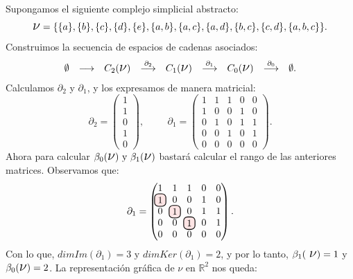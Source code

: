 \documentclass[12pt, a4paper, twoside]{book}
\newcommand\hlightr[1]{\tikz[overlay, remember picture,baseline=-
\the\dimexpr\fontdimen22\textfont2\relax]\node[rectangle,fill=red!50,rounded 
corners,fill opacity = 0.2,draw,thick,text opacity =1] {$#1$};}
\numberwithin{equation}{section}
\theoremstyle{definition}
\newenvironment{ejem}
  {\pushQED{\qed}\renewcommand{\qedsymbol}{$\blacktriangleleft$}\ejemplo}
  {\popQED\endejemplo}
\theoremstyle{remark}
\theoremstyle{plain}
\begin{document}
	\begin{ejem}
		Supongamos el siguiente complejo simplicial abstracto:
		\begin{equation*} 
			\text{{\Large $\nu$}}=\{\{a\},\{b\},\{c\},\{d\},\{e\},
			\{a,b\},\{a,c\},\{a,d\},\{b,c\},\{c,d\},\{a,b,c\}\}.
		\end{equation*}
		Construimos la secuencia de espacios de cadenas asociados:
		\begin{equation*}
			 \left.
			\begin{array}{ccccccccc}
				\emptyset & 
				\longrightarrow & C_{2}(
				\text{{\Large $\nu$}}) & 
				\overset{\partial_{2}}{
				\longrightarrow} & C_{1}(\text{{\Large $\nu$}}) 
						& \overset{\partial_{1}}{
				\longrightarrow} 
				& C_{0}(\text{{\Large $\nu$}}) & 
				\overset{\partial_{0}}{
				\longrightarrow} & \emptyset. 
			\end{array}
			\right. 
		\end{equation*}
		Calculamos $\partial_{2}$ y $\partial_{1}$, y los expresamos 
		de manera matricial:
		\begin{equation*}
			\partial_{2}=
			\begin{pmatrix}
			1 \\
			1 \\
			0 \\
			1 \\
			0
			\end{pmatrix},
			\hspace{1cm}
			\partial_{1}=
			\begin{pmatrix}
			1 & 1 & 1 & 0 & 0\\
			1 & 0 & 0 & 1 & 0\\
			0 & 1 & 0 & 1 & 1\\
			0 & 0 & 1 & 0 & 1\\
			0 & 0 & 0 & 0 & 0
			\end{pmatrix}.
		\end{equation*}
		Ahora para calcular $\beta_{0}(\text{{\Large $\nu$}}) 
		\text{ y } \beta_{1}(\text{{\Large $\nu$}})$ bastará
		calcular el rango de las anteriores matrices. Observamos que:
		\begin{equation*}
			\partial_{1}=
			\begin{pmatrix}
			1 & 1 & 1 & 0 & 0\\
			\hlightr{1} & 0 & 0 & 1 & 0\\
			0 & \hlightr{1} & 0 & 1 & 1\\
			0 & 0 & \hlightr{1} & 0 & 1\\
			0 & 0 & 0 & 0 & 0
			\end{pmatrix}.
		\end{equation*}
		Con lo que, $dimIm(\partial_{1})=3 \text{ y } 
		dimKer(\partial_{1})=2$, y por lo tanto, $\beta_{1}(\text{
		{\Large $\nu$}})=1$ y $\beta_{0}(\text{{\Large $\nu$}})=2$. La
		representación gráfica de {\Large $\nu$} en $\mathbb{R}^{2}$
		nos queda:
		\begin{figure}[H]
			\centering
\end{figure}
\end{ejem}
\end{document}
